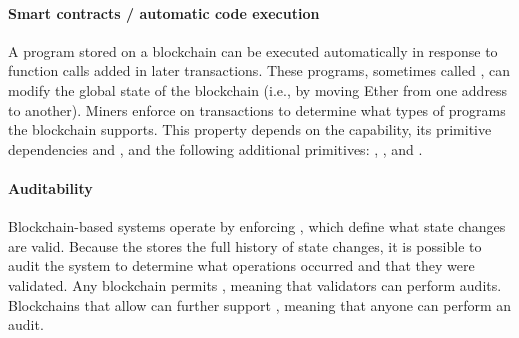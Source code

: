 \paragraph{Smart contracts / automatic code execution} A program stored on a blockchain can be executed automatically in response to function calls added in later transactions. These programs, sometimes called , can modify the global state of the blockchain (i.e., by moving Ether from one address to another). Miners enforce  on transactions to determine what types of programs the blockchain supports. This property depends on the  capability, its primitive dependencies  and , and the following additional primitives: , , and .

\paragraph{Auditability} Blockchain-based systems operate by enforcing , which define what state changes are valid. Because the  stores the full history of state changes, it is possible to audit the system to determine what operations occurred and that they were validated. Any blockchain permits , meaning that validators can perform audits. Blockchains that allow  can further support , meaning that anyone can perform an audit.

